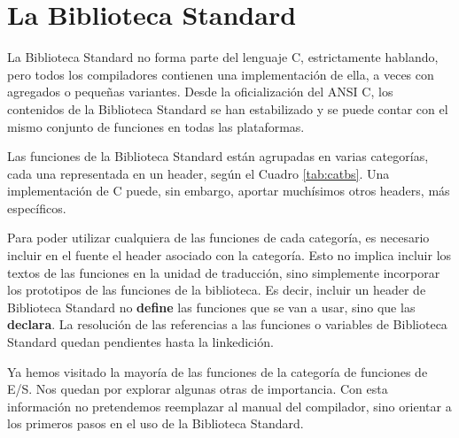 



\chapter{La Biblioteca Standard}
\label{tc-bstandard}



La Biblioteca Standard no forma parte del lenguaje C, estrictamente hablando, pero todos
los compiladores contienen una implementación de ella, a veces con agregados o pequeñas
variantes. Desde la oficialización del ANSI C, los contenidos de la Biblioteca
Standard se han estabilizado y se puede contar con el mismo conjunto de
funciones en todas las plataformas.

Las funciones de la Biblioteca Standard están agrupadas en varias categorías, cada una representada en un header, según el Cuadro \ref{tab:catbs}. Una
implementación de C puede, sin embargo, aportar muchísimos otros headers, más específicos. 

Para poder utilizar cualquiera de las funciones de cada categoría, es necesario
incluir en el fuente el header asociado con la categoría. Esto no
implica incluir los textos de las funciones en la unidad de traducción, sino
simplemente incorporar los prototipos de las funciones de la biblioteca. Es
decir, incluir un header de Biblioteca Standard no \textbf{define} las funciones que se
van a usar, sino que las \textbf{declara}. La resolución de las referencias a las
funciones o variables de Biblioteca Standard quedan pendientes hasta la
linkedición.

Ya hemos visitado la mayoría de las funciones de la categoría de funciones de E/S. Nos
quedan por explorar algunas otras de importancia. Con
esta información no pretendemos reemplazar al manual del compilador, sino
orientar a los primeros pasos en el uso de la Biblioteca Standard.

